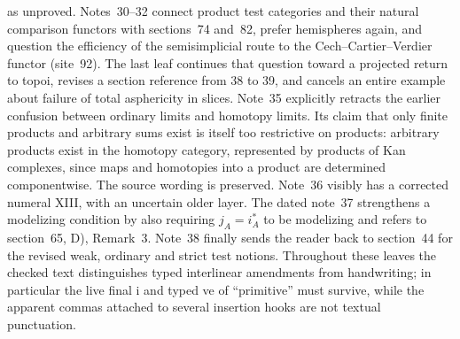 as unproved. Notes~30--32 connect product test categories and their natural comparison functors with sections~74 and~82, prefer hemispheres again, and question the efficiency of the semisimplicial route to the Cech--Cartier--Verdier functor (site~92). The last leaf continues that question toward a projected return to topoi, revises a section reference from 38 to 39, and cancels an entire example about failure of total asphericity in slices. Note~35 explicitly retracts the earlier confusion between ordinary limits and homotopy limits. Its claim that only finite products and arbitrary sums exist is itself too restrictive on products: arbitrary products exist in the homotopy category, represented by products of Kan complexes, since maps and homotopies into a product are determined componentwise. The source wording is preserved. Note~36 visibly has a corrected numeral XIII, with an uncertain older layer. The dated note~37 strengthens a modelizing condition by also requiring $j_A=i_A^*$ to be modelizing and refers to section~65, D), Remark~3. Note~38 finally sends the reader back to section~44 for the revised weak, ordinary and strict test notions. Throughout these leaves the checked text distinguishes typed interlinear amendments from handwriting; in particular the live final i and typed ve of ``primitive'' must survive, while the apparent commas attached to several insertion hooks are not textual punctuation.

